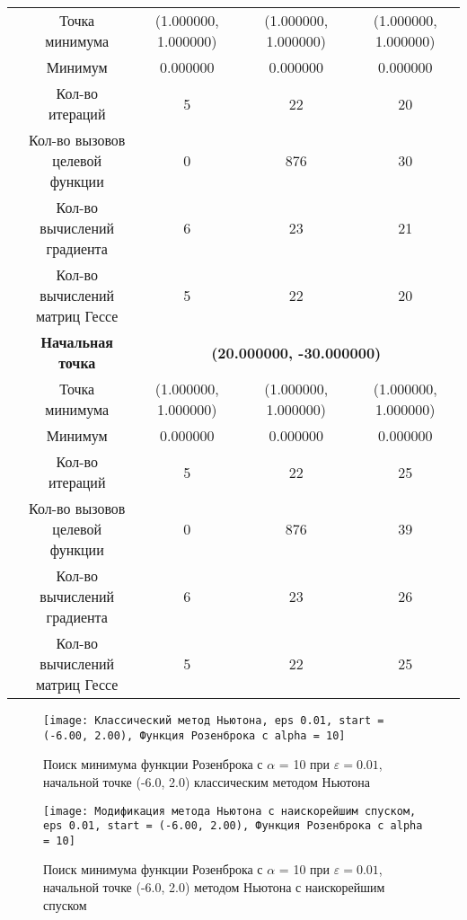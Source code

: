 \begin{table}[H]
\begin{tabular}{|c|c|c|c|c|}
	\cline{2-5}
	&Точка минимума &(1.000000, 1.000000) &(1.000000, 1.000000) &(1.000000, 1.000000) \\ 
	\cline{2-5}
	&Минимум &0.000000 &0.000000 &0.000000 \\ 
	\cline{2-5}
	&Кол-во итераций &5 &22 &20 \\ 
	\cline{2-5}
	&\makecell{Кол-во вызовов\\целевой функции} &0 &876 &30 \\ 
	\cline{2-5}
	&\makecell{Кол-во вычислений\\градиента} &6 &23 &21 \\ 
	\cline{2-5}
	&\makecell{Кол-во вычислений\\матриц Гессе} &5 &22 &20 \\ 
	\cline{2-5}
\cline{2-5}&\textbf{Начальная точка} &\multicolumn{3}{c|}{\textbf{(20.000000, -30.000000)}}\\
	\cline{2-5}
	&Точка минимума &(1.000000, 1.000000) &(1.000000, 1.000000) &(1.000000, 1.000000) \\ 
	\cline{2-5}
	&Минимум &0.000000 &0.000000 &0.000000 \\ 
	\cline{2-5}
	&Кол-во итераций &5 &22 &25 \\ 
	\cline{2-5}
	&\makecell{Кол-во вызовов\\целевой функции} &0 &876 &39 \\ 
	\cline{2-5}
	&\makecell{Кол-во вычислений\\градиента} &6 &23 &26 \\ 
	\cline{2-5}
	&\makecell{Кол-во вычислений\\матриц Гессе} &5 &22 &25 \\ 
	\cline{2-5}
	\hline

\end{tabular}
\end{table}


            \begin{figure}[H]
	        \centering
	        \texttt{[image: Классический метод Ньютона, eps 0.01, start = (-6.00, 2.00), Функция Розенброка с alpha = 10]}%
	        \caption{Поиск минимума функции Розенброка с $\alpha$ = 10 при $\varepsilon = 0.01$, начальной точке (-6.0, 2.0) классическим методом Ньютона}
	        \vspace*{-1.2cm}
            \end{figure}
            
            \begin{figure}[H]
	        \centering
	        \texttt{[image: Модификация метода Ньютона с наискорейшим спуском, eps 0.01, start = (-6.00, 2.00), Функция Розенброка с alpha = 10]}%
	        \caption{Поиск минимума функции Розенброка с $\alpha$ = 10 при $\varepsilon = 0.01$, начальной точке (-6.0, 2.0) методом Ньютона с наискорейшим спуском}
	        \vspace*{-1.2cm}
            \end{figure}
            

